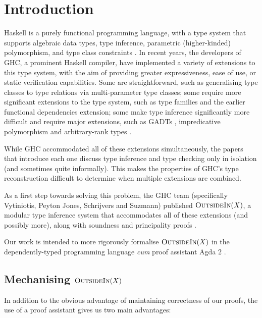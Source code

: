 \documentclass[a4paper]{jfp}
\newcommand{\outsidein}{\textsc{OutsideIn}(X)}
\begin{document}
\section{Introduction}
Haskell is a purely functional programming language, with a type system that supports algebraic data types, type inference, parametric (higher-kinded) polymorphism, and type class constraints \cite{Anonymous:2010we}. In recent years, the developers of GHC, a prominent Haskell compiler, have implemented a variety of extensions to this type system, with the aim of providing greater expressiveness, ease of use, or static verification capabilities. Some are straightforward, such as generalising type classes to type relations via multi-parameter type classes; some require more significant extensions to the type system, such as type families \cite{citeulike:9320233} and the earlier functional dependencies extension; some make type inference significantly more difficult and require major extensions, such as GADTs \cite{Schrijvers:2009jg}, impredicative polymorphism and arbitrary-rank types \cite{Jones:2007dr}.

While GHC accommodated all of these extensions simultaneously, the papers that introduce each one discuss type inference and type checking only in isolation (and sometimes quite informally). This makes the properties of GHC's type reconstruction difficult to determine when multiple extensions are combined.  

As a first step towards solving this problem, the GHC team (specifically Vytiniotis, Peyton Jones, Schrijvers and Suzmann) published $\outsidein$, a modular type inference system that accommodates all of these extensions (and possibly more), along with soundness and principality proofs \cite{Vytiniotis:2011:OMT:2139531.2139533}. 

Our work is intended to more rigorously formalise $\outsidein$ in the dependently-typed programming language \emph{cum} proof assistant Agda 2 \cite{conf/afp/norell08}.

\subsection{Mechanising $\outsidein$}

In addition to the obvious advantage of maintaining correctness of our proofs, the use of a proof assistant gives us two main advantages:
\end{document}
